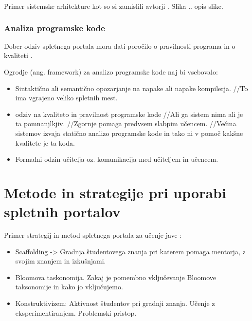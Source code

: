 Primer sistemske arhitekture kot so si zamislili avtorji
\cite{ITaLCP_DistanceEdu}. Slika .. opis slike.

\subsubsection{Analiza programske kode}
\label{sec:analiza_programske_kode}


Dober odziv spletnega portala mora dati poročilo o pravilnosti programa in o
kvaliteti \cite{thesisAWebP}.

Ogrodje (ang. framework) za analizo programske kode naj bi vsebovalo:

\begin{itemize}
\item
  Sintaktično ali semantično opozarjanje na napake ali napake
  kompilerja. //To ima vgrajeno veliko spletnih mest.
\item
  odziv na kvaliteto in pravilnost programske kode //Ali ga sistem nima
  ali je ta pomnanjlkjiv. //Zgornje pomaga predvsem slabpim učencem.
  //Večina sistemov izvaja statično analizo programske kode in tako ni v
  pomoč kakšne kvalitete je ta koda.
\item
  Formalni odzin učitelja oz. komunikacija med učiteljem in učencem.
\end{itemize}


\section{Metode in strategije pri uporabi spletnih portalov}
\label{sec:Metode_in_strategije_pri_učenju_programiranja}

Primer strategij in metod spletnega portala za učenje jave
\cite{thesisAWebP}:

\begin{itemize}
\item
  Scaffolding -\textgreater{} Gradnja študentovega znanja
  pri katerem pomaga mentorja, z svojim znanjem in izkušnjami.
\item
  Bloomova taskonomija. Zakaj je pomembno vključevanje Bloomove
  taksonomije in kako jo vključujemo.
\item
  Konstruktivizem: Aktivnost študentov pri gradnji znanja. Učenje z
  eksperimentiranjem. Problemski pristop.
\end{itemize}

